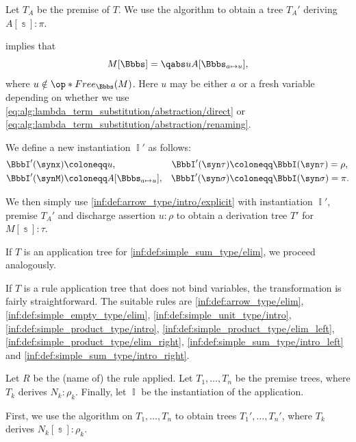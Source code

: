 \begin{algorithm}
\begin{thmenum}
    Let \( T_A \) be the premise of \( T \). We use the algorithm to obtain a tree \( T_A' \) deriving \( A[\Bbbs]: \pi \).

     implies that
    \begin{equation*}
      M[\Bbbs] = \qabs u A[\Bbbs_{a \mapsto u}],
    \end{equation*}
    where \( u \notin \op*{Free}_\Bbbs(M) \). Here \( u \) may be either \( a \) or a fresh variable depending on whether we use \eqref{eq:alg:lambda_term_substitution/abstraction/direct} or \eqref{eq:alg:lambda_term_substitution/abstraction/renaming}.

    We define a new instantiation \( \BbbI' \) as follows:
    \begin{align*}
      \BbbI'(\synx) &\coloneqq u,                      &\BbbI'(\syn\tau) &\coloneqq \BbbI(\syn\tau) = \rho, \\
      \BbbI'(\synM) &\coloneqq A[\Bbbs_{a \mapsto u}], &\BbbI'(\syn\sigma) &\coloneqq \BbbI(\syn\sigma) = \pi.
    \end{align*}

    We then simply use \ref{inf:def:arrow_type/intro/explicit} with instantiation \( \BbbI' \), premise \( T_A' \) and discharge assertion \( u: \rho \) to obtain a derivation tree \( T' \) for \( M[\Bbbs]: \tau \).

     If \( T \) is an application tree for \ref{inf:def:simple_sum_type/elim}, we proceed analogously.

     If \( T \) is a rule application tree that does not bind variables, the transformation is fairly straightforward. The suitable rules are \ref{inf:def:arrow_type/elim}, \ref{inf:def:simple_empty_type/elim}, \ref{inf:def:simple_unit_type/intro}, \ref{inf:def:simple_product_type/intro}, \ref{inf:def:simple_product_type/elim_left}, \ref{inf:def:simple_product_type/elim_right}, \ref{inf:def:simple_sum_type/intro_left} and \ref{inf:def:simple_sum_type/intro_right}.

    Let \( R \) be the (name of) the rule applied. Let \( T_1, \ldots, T_n \) be the premise trees, where \( T_k \) derives \( N_k: \rho_k \). Finally, let \( \BbbI \) be the instantiation of the application.

    First, we use the algorithm on \( T_1, \ldots, T_n \) to obtain trees \( T_1', \ldots, T_n' \), where \( T_k \) derives \( N_k[\Bbbs]: \rho_k \).


\end{thmenum}
\end{algorithm}
